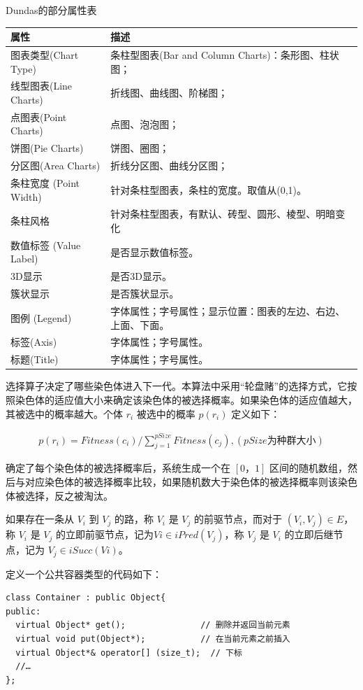 \begin{newtable}
  \caption{Dundas的部分属性表}
  \begin{tabular}{ll}
    \toprule
    属性 & 描述 \\
    \midrule
    图表类型(Chart Type) &	条柱型图表(Bar and Column Charts)：条形图、柱状图；\\[2ex]
    线型图表(Line Charts) & 折线图、曲线图、阶梯图；\\[2ex]
    点图表(Point Charts) & 点图、泡泡图；\\[2ex]
    饼图(Pie Charts) & 饼图、圈图；\\[2ex]
    分区图(Area Charts) & 折线分区图、曲线分区图；\\[2ex]
    条柱宽度 (Point Width) &	针对条柱型图表，条柱的宽度。取值从(0,1)。\\[2ex]
    条柱风格 &	针对条柱型图表，有默认、砖型、圆形、棱型、明暗变化\\[2ex]
    数值标签 (Value Label)	& 是否显示数值标签。\\[2ex]
    3D显示	& 是否3D显示。\\[2ex]
    簇状显示 &	是否簇状显示。\\[2ex]
    图例 (Legend) &	字体属性；字号属性；显示位置：图表的左边、右边、上面、下面。\\[2ex]
    标签(Axis) &	字体属性；字号属性。\\[2ex]
    标题(Title) &	字体属性；字号属性。\\[2ex]
    \bottomrule
  \end{tabular}
\end{newtable}

选择算子决定了哪些染色体进入下一代。本算法中采用“轮盘赌”的选择方式，它按照染色体的适应值大小来确定该染色体的被选择概率。如果染色体的适应值越大，其被选中的概率越大。个体 $r_i$ 被选中的概率 $p(r_i)$ 定义如下：

\begin{align}
p(r_i) = Fitness(c_i) / \sum_{j=1}^{pSize} Fitness (c_j), (pSize \mbox{为种群大小}) \tag{公式 2-1}
\end{align}

确定了每个染色体的被选择概率后，系统生成一个在 $[0，1]$ 区间的随机数组，然后与对应染色体的被选择概率比较，如果随机数大于染色体的被选择概率则该染色体被选择，反之被淘汰。

\begin{definition}
如果存在一条从 $V_i$ 到 $V_j$ 的路，称 $V_i$ 是 $V_j$ 的前驱节点，而对于 $(V_i, V_j) \in E$，称 $V_i$ 是 $V_j$ 的立即前驱节点，记为$Vi \in iPred(V_j)$，称 $V_j$ 是 $V_i$ 的立即后继节点，记为 $V_j \in iSucc(Vi)$。
\end{definition}

定义一个公共容器类型的代码如下：

\begin{verbatim}
class Container : public Object{
public:
  virtual Object* get();               // 删除并返回当前元素
  virtual void put(Object*);           // 在当前元素之前插入
  virtual Object*& operator[] (size_t);  // 下标
  //…
};
\end{verbatim}
